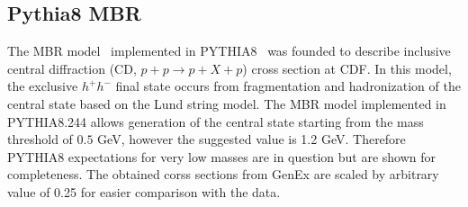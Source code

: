 \subsection{Pythia8 MBR}
The MBR model~\cite{mbr_pythia8} implemented in PYTHIA8~\cite{pythia8} was founded to describe inclusive 
central diffraction (CD, $p+p\rightarrow p+X+p$) cross section at CDF. In this model, the exclusive $h^+h^-$ final state occurs from fragmentation and hadronization of the central state based on the Lund string model. The MBR model implemented in PYTHIA8.244 allows generation of the central state starting from the mass threshold of 
$0.5$ GeV, however the suggested value is 1.2 GeV. Therefore PYTHIA8 expectations for very low masses are in question but are shown for completeness. The obtained corss sections from GenEx are scaled by arbitrary value of 0.25 for easier comparison with the data.

